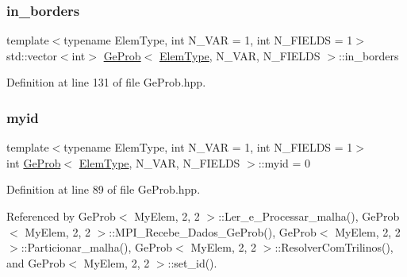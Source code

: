 \mbox{\label{classGeProb_a9615df97c98b9b37d98f8548fad48439}} 
\subsubsection{\texorpdfstring{in\+\_\+borders}{in\_borders}}
{\footnotesize\ttfamily template$<$typename Elem\+Type, int N\+\_\+\+V\+AR = 1, int N\+\_\+\+F\+I\+E\+L\+DS = 1$>$ \\
std\+::vector$<$int$>$ \hyperlink{classGeProb}{Ge\+Prob}$<$ \hyperlink{spectral_8h_aaa2c1a7b2d1b12c590d730fe6ac839fa}{Elem\+Type}, N\+\_\+\+V\+AR, N\+\_\+\+F\+I\+E\+L\+DS $>$\+::in\+\_\+borders\hspace{0.3cm}{\ttfamily [protected]}}



Definition at line 131 of file Ge\+Prob.\+hpp.

\mbox{\label{classGeProb_a45014741c0457991fb88b1dc1d2d31bc}} 
\subsubsection{\texorpdfstring{myid}{myid}}
{\footnotesize\ttfamily template$<$typename Elem\+Type, int N\+\_\+\+V\+AR = 1, int N\+\_\+\+F\+I\+E\+L\+DS = 1$>$ \\
int \hyperlink{classGeProb}{Ge\+Prob}$<$ \hyperlink{spectral_8h_aaa2c1a7b2d1b12c590d730fe6ac839fa}{Elem\+Type}, N\+\_\+\+V\+AR, N\+\_\+\+F\+I\+E\+L\+DS $>$\+::myid = 0\hspace{0.3cm}{\ttfamily [protected]}}



Definition at line 89 of file Ge\+Prob.\+hpp.



Referenced by Ge\+Prob$<$ My\+Elem, 2, 2 $>$\+::\+Ler\+\_\+e\+\_\+\+Processar\+\_\+malha(), Ge\+Prob$<$ My\+Elem, 2, 2 $>$\+::\+M\+P\+I\+\_\+\+Recebe\+\_\+\+Dados\+\_\+\+Ge\+Prob(), Ge\+Prob$<$ My\+Elem, 2, 2 $>$\+::\+Particionar\+\_\+malha(), Ge\+Prob$<$ My\+Elem, 2, 2 $>$\+::\+Resolver\+Com\+Trilinos(), and Ge\+Prob$<$ My\+Elem, 2, 2 $>$\+::set\+\_\+id().

\mbox{\label{classGeProb_a646b814acd21db4a20bbbd9fe159da3f}} 
